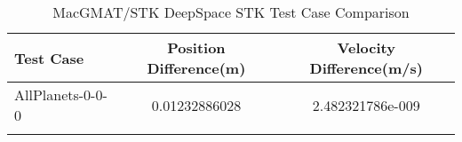 \begin{table}[htbp!]
\centering
\caption{ MacGMAT/STK DeepSpace STK Test Case Comparison}
      \begin{tabular}{lcc}
      \hline\hline
          Test Case & Position Difference(m) & Velocity Difference(m/s) \\
         \hline
         AllPlanets-0-0-0 & 0.01232886028 & 2.482321786e-009 \\
      \hline\hline
      \label{Table: DeepSpace STK Table} 
\end{tabular}
\end{table}
